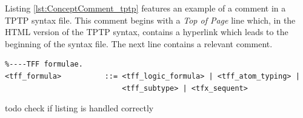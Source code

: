 Listing \ref{lst:ConceptComment_tptp} features an example of a comment in a \ac{TPTP} syntax file. This comment begins with a \textit{Top of Page} line which, in the HTML version of the \ac{TPTP} syntax, contains a hyperlink which leads to the beginning of the syntax file.
The next line contains a relevant comment.\\
\begin{lstlisting}[language=none, basicstyle=\scriptsize	,caption= Example of a comment in the \ac{TPTP} syntax,label= lst:ConceptComment_tptp]
%----Top of Page---------------------------------------------------------------
%----TFF formulae.
<tff_formula>          ::= <tff_logic_formula> | <tff_atom_typing> |
                           <tff_subtype> | <tfx_sequent>
\end{lstlisting}
todo check if listing is handled correctly

